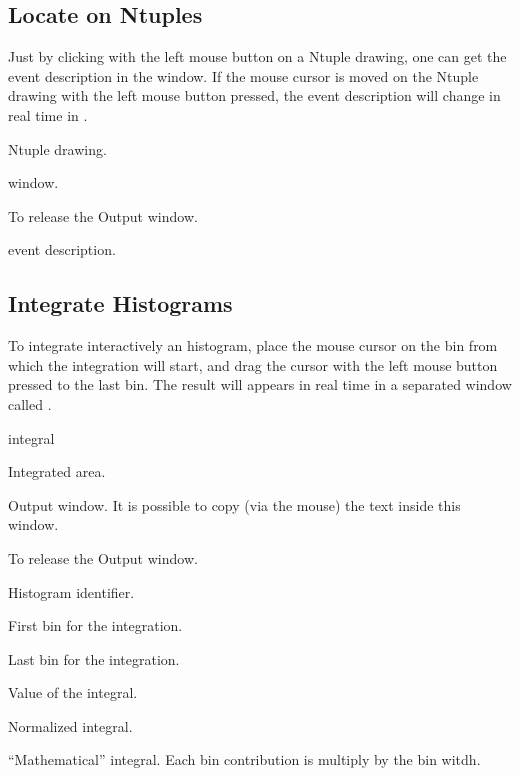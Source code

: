\newpage
\subsection{Locate on Ntuples}
Just by clicking with the left mouse button on a Ntuple drawing, one can get
the event description in the \PL{} window. If the mouse cursor is moved
on the Ntuple drawing with the left mouse button pressed, the event description
will change in real time in \PL.


\begin{EnumZB}
\item Ntuple drawing.
\item \PL{} window.
\item To release the Output window.
\item event description.
\end{EnumZB}

\subsection{Integrate Histograms}
To integrate interactively an histogram, place the mouse cursor on the
bin from which the integration will start, and drag the cursor with the
left mouse button pressed to the last bin. The result will appears in real time
in a separated window called \PL{} .

\begin{PAWf}[.7]{integral}
\begin{EnumZB}
\item Integrated area.
\item Output window. It is possible to copy (via the mouse) the
      text inside this window.
\item To release the Output window.
\end{EnumZB}
\begin{EnumZW}
\item Histogram identifier.
\item First bin for the integration.
\item Last bin for the integration.
\item Value of the integral.
\item Normalized integral.
\item ``Mathematical'' integral. Each bin contribution is
      multiply by the bin witdh.
\end{EnumZW}
\end{PAWf}

